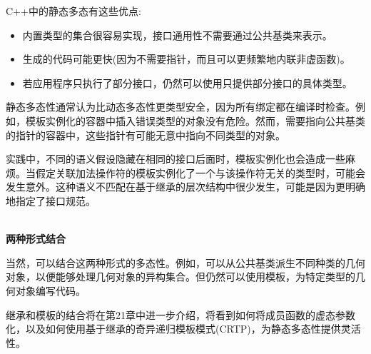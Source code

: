 C++中的静态多态有这些优点:

\begin{itemize}
\item 
内置类型的集合很容易实现，接口通用性不需要通过公共基类来表示。

\item 
生成的代码可能更快(因为不需要指针，而且可以更频繁地内联非虚函数)。

\item 
若应用程序只执行了部分接口，仍然可以使用只提供部分接口的具体类型。
\end{itemize}

静态多态性通常认为比动态多态性更类型安全，因为所有绑定都在编译时检查。例如，模板实例化的容器中插入错误类型的对象没有危险。然而，需要指向公共基类的指针的容器中，这些指针有可能无意中指向不同类型的对象。

实践中，不同的语义假设隐藏在相同的接口后面时，模板实例化也会造成一些麻烦。当假定关联加法操作符的模板实例化了一个与该操作符无关的类型时，可能会发生意外。这种语义不匹配在基于继承的层次结构中很少发生，可能是因为更明确地指定了接口规范。

\hspace*{\fill} \\ %
\noindent
\textbf{两种形式结合}

当然，可以结合这两种形式的多态性。例如，可以从公共基类派生不同种类的几何对象，以便能够处理几何对象的异构集合。但仍然可以使用模板，为特定类型的几何对象编写代码。

继承和模板的结合将在第21章中进一步介绍，将看到如何将成员函数的虚态参数化，以及如何使用基于继承的奇异递归模板模式(CRTP)，为静态多态性提供灵活性。




























